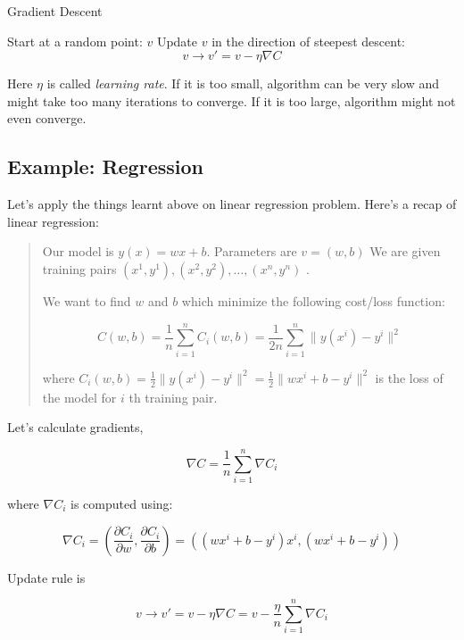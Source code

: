 \documentclass[a4paper]{tufte-handout}
\begin{document}
\begin{algorithm}
\caption{Gradient Descent}
\begin{algorithmic}[1]
  \STATE Start at a random point: \(v\)
  \STATE Update \(v\) in the direction of steepest descent: 
      \[v \rightarrow v' = v -\eta \nabla C\]
  \ENDWHILE
\end{algorithmic}
\end{algorithm}



Here \(\eta\) is called \emph{learning rate}. If it is too small,
algorithm can be very slow and might take too many iterations to
converge. If it is too large, algorithm might not even converge.

\subsection{Example: Regression}\label{example-regression}

Let's apply the things learnt above on linear regression problem. Here's
a recap of linear regression:

\begin{quote}
Our model is \(y(x) = wx + b\). Parameters are \(v = (w, b)\) We are
given training pairs \((x^1, y^1), (x^2, y^2), \ldots, (x^n, y^n)\)
.

We want to find \(w\) and \(b\) which minimize the following cost/loss
function:

\[ C(w, b) = \frac{1}{n} \sum_{i = 1}^{n} C_i(w, b) = \frac{1}{2n} \sum_{i = 1}^{n} \| y(x^i) - y^i\|^2 \]

where
\(C_i(w, b) = \frac{1}{2} \| y(x^i) - y^i\|^2 = \frac{1}{2} \| wx^i + b - y^i\|^2\)
is the loss of the model for \(i\) th training pair.
\end{quote}


Let's calculate gradients,

\[ \nabla C = \frac{1}{n} \sum_{i = 1}^{n} \nabla C_i \]

where \(\nabla C_i\) is computed using:

\[ \nabla C_i = \left( \frac{\partial C_i}{\partial w}, \frac{\partial C_i}{\partial b}  \right) = \left( (wx^i + b - y^i)x^i, (wx^i + b - y^i) \right)\]

Update rule is

\[ v \rightarrow v' = v -\eta \nabla C = v -\frac{\eta}{n} \sum_{i = 1}^{n} \nabla C_i \]
\end{document}
